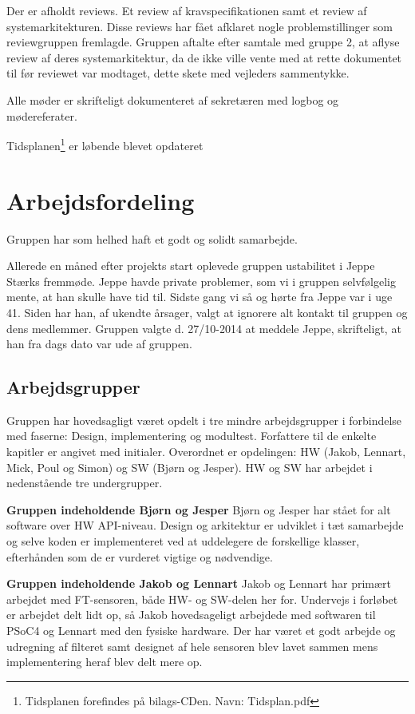 Der er afholdt reviews. Et review af kravspecifikationen samt et review af systemarkitekturen. 
Disse reviews har fået afklaret nogle problemstillinger som reviewgruppen fremlagde. 
Gruppen aftalte efter samtale med gruppe 2, at aflyse review af deres systemarkitektur, da de ikke ville vente med at rette dokumentet til før reviewet var modtaget, dette skete med vejleders sammentykke.  

Alle møder er skrifteligt dokumenteret af sekretæren med logbog og mødereferater. 

Tidsplanen\footnote{Tidsplanen forefindes på bilags-CDen. Navn: Tidsplan.pdf} er løbende blevet opdateret 

\section{Arbejdsfordeling}

Gruppen har som helhed haft et godt og solidt samarbejde. 

Allerede en måned efter projekts start oplevede gruppen ustabilitet i Jeppe Stærks fremmøde. Jeppe havde private problemer, som vi i gruppen selvfølgelig mente, at han skulle have tid til. Sidste gang vi så og hørte fra Jeppe var i uge 41. Siden har han, af ukendte årsager, valgt at ignorere alt kontakt til gruppen og dens medlemmer. Gruppen valgte d. 27/10-2014 at meddele Jeppe, skrifteligt, at han fra dags dato var ude af gruppen.     

\subsection{Arbejdsgrupper}
Gruppen har hovedsagligt været opdelt i tre mindre arbejdsgrupper i forbindelse med faserne: Design, implementering og modultest. Forfattere til de enkelte kapitler er angivet med initialer.
Overordnet er opdelingen: HW (Jakob, Lennart, Mick, Poul og Simon) og SW (Bjørn og Jesper). 
HW og SW har arbejdet i nedenstående tre undergrupper.

\textbf{Gruppen indeholdende Bjørn og Jesper} \newline
Bjørn og Jesper har stået for alt software over HW API-niveau. Design og arkitektur er udviklet i tæt samarbejde og selve koden er implementeret ved at uddelegere de forskellige klasser, efterhånden som de er vurderet vigtige og nødvendige.

\textbf{Gruppen indeholdende Jakob og Lennart} \newline
Jakob og Lennart har primært arbejdet med FT-sensoren, både HW- og SW-delen her for. Undervejs i forløbet er arbejdet delt lidt op, så Jakob hovedsageligt arbejdede med softwaren til PSoC4 og Lennart med den fysiske hardware. Der har været et godt arbejde og udregning af filteret samt designet af hele sensoren blev lavet sammen mens implementering heraf blev delt mere op. 


